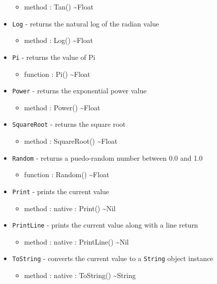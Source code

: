 \documentclass[12pt]{article}
\begin{document}
\begin{itemize}
\begin{itemize}
  \item method : Tan() \textasciitilde Float
  \end{itemize}
\item \texttt{Log} - returns the natural log of the radian value
  \begin{itemize}
  \item method : Log() \textasciitilde Float
  \end{itemize}
\item \texttt{Pi} - returns the value of Pi
  \begin{itemize}
  \item function : Pi() \textasciitilde Float
  \end{itemize}
\item \texttt{Power} - returns the exponential power value
  \begin{itemize}
  \item method : Power() \textasciitilde Float
  \end{itemize}
\item \texttt{SquareRoot} - returns the square root
  \begin{itemize}
  \item method : SquareRoot() \textasciitilde Float
  \end{itemize}
\item \texttt{Random} - returns a puedo-random number between 0.0 and
  1.0
  \begin{itemize}
  \item function : Random() \textasciitilde Float
  \end{itemize}
\item \texttt{Print} - prints the current value
  \begin{itemize}
  \item method : native : Print() \textasciitilde Nil
  \end{itemize}
\item \texttt{PrintLine} - prints the current value along with a line
  return
  \begin{itemize}
  \item method : native : PrintLine() \textasciitilde Nil
  \end{itemize}
\item \texttt{ToString} - converts the current value to a
  \texttt{String} object instance
  \begin{itemize}
  \item method : native : ToString() \textasciitilde String
  \end{itemize}
\end{itemize}
\end{document}

